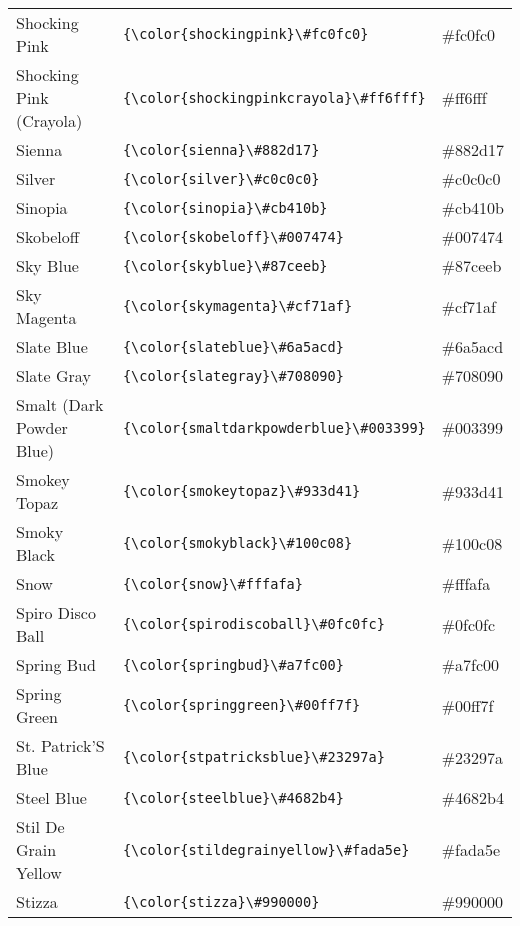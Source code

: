\documentclass[9.5pt]{article}
\begin{document}
\begin{longtable}{l | l | l}
	Shocking Pink & \verb!{\color{shockingpink}\#fc0fc0}! & {\color{shockingpink}\#fc0fc0}\\
	Shocking Pink (Crayola) & \verb!{\color{shockingpinkcrayola}\#ff6fff}! & {\color{shockingpinkcrayola}\#ff6fff}\\
	Sienna & \verb!{\color{sienna}\#882d17}! & {\color{sienna}\#882d17}\\
	Silver & \verb!{\color{silver}\#c0c0c0}! & {\color{silver}\#c0c0c0}\\
	Sinopia & \verb!{\color{sinopia}\#cb410b}! & {\color{sinopia}\#cb410b}\\
	Skobeloff & \verb!{\color{skobeloff}\#007474}! & {\color{skobeloff}\#007474}\\
	Sky Blue & \verb!{\color{skyblue}\#87ceeb}! & {\color{skyblue}\#87ceeb}\\
	Sky Magenta & \verb!{\color{skymagenta}\#cf71af}! & {\color{skymagenta}\#cf71af}\\
	Slate Blue & \verb!{\color{slateblue}\#6a5acd}! & {\color{slateblue}\#6a5acd}\\
	Slate Gray & \verb!{\color{slategray}\#708090}! & {\color{slategray}\#708090}\\
	Smalt (Dark Powder Blue) & \verb!{\color{smaltdarkpowderblue}\#003399}! & {\color{smaltdarkpowderblue}\#003399}\\
	Smokey Topaz & \verb!{\color{smokeytopaz}\#933d41}! & {\color{smokeytopaz}\#933d41}\\
	Smoky Black & \verb!{\color{smokyblack}\#100c08}! & {\color{smokyblack}\#100c08}\\
	Snow & \verb!{\color{snow}\#fffafa}! & {\color{snow}\#fffafa}\\
	Spiro Disco Ball & \verb!{\color{spirodiscoball}\#0fc0fc}! & {\color{spirodiscoball}\#0fc0fc}\\
	Spring Bud & \verb!{\color{springbud}\#a7fc00}! & {\color{springbud}\#a7fc00}\\
	Spring Green & \verb!{\color{springgreen}\#00ff7f}! & {\color{springgreen}\#00ff7f}\\
	St. Patrick'S Blue & \verb!{\color{stpatricksblue}\#23297a}! & {\color{stpatricksblue}\#23297a}\\
	Steel Blue & \verb!{\color{steelblue}\#4682b4}! & {\color{steelblue}\#4682b4}\\
	Stil De Grain Yellow & \verb!{\color{stildegrainyellow}\#fada5e}! & {\color{stildegrainyellow}\#fada5e}\\
	Stizza & \verb!{\color{stizza}\#990000}! & {\color{stizza}\#990000}\\

\end{longtable}
\end{document}
